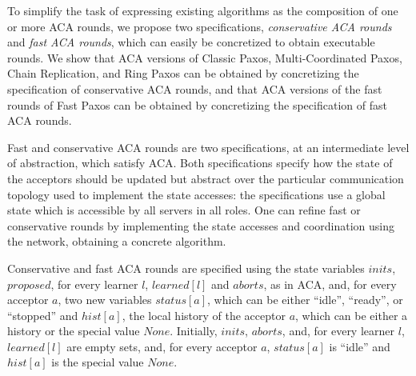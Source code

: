 To simplify the task of expressing existing algorithms as the composition of one
or more ACA rounds, we propose two specifications, \emph{conservative ACA
rounds} and
\emph{fast ACA rounds}, which can easily be concretized to obtain executable rounds.
We show that ACA versions of Classic Paxos, Multi-Coordinated Paxos, Chain
Replication, and Ring Paxos can be obtained by concretizing the specification of
conservative ACA rounds, and that ACA versions of the fast rounds of Fast Paxos can be obtained by concretizing the specification of fast ACA rounds.

Fast and conservative ACA rounds are two specifications, at an
intermediate level of abstraction, which satisfy ACA. Both
specifications specify how the state of the acceptors should be
updated but abstract over the particular communication topology used
to implement the state accesses: the specifications use a global state
which is accessible by all servers in all roles. One can refine fast
or conservative rounds by implementing the state accesses and coordination
using the network, obtaining a concrete algorithm.

Conservative and fast ACA rounds are specified using the state variables $inits$, $proposed$, for every learner $l$, $learned\left[ l \right]$
and $aborts$, as in ACA, and, for every acceptor $a$, two new variables
$status\left[ a \right]$, which can be either ``idle'', ``ready'', or
``stopped'' and $hist\left[ a \right]$, the local history of the
acceptor $a$, which can be either a history or the special value $None$.
Initially, $inits$, $aborts$, and, for every learner
$l$, $learned\left[ l \right]$ are empty sets, and, for every acceptor $a$,
$status\left[ a \right]$  is ``idle'' and $hist\left[ a \right]$ is the special
value $None$.

